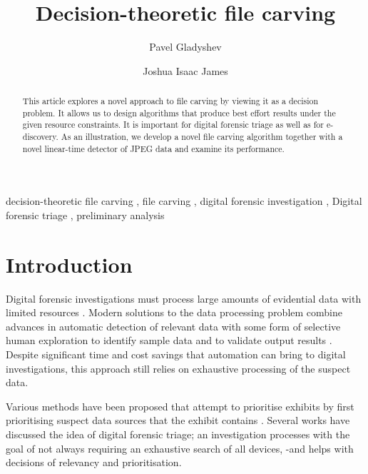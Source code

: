 \documentclass[final,5p,times,twocolumn,authoryear]{elsarticle}
\begin{document}
\begin{frontmatter}

\title{Decision-theoretic file carving}

\author[add1]{Pavel Gladyshev}
\author[add2]{Joshua Isaac James}
\address[add1]{Digital Forensics Investigation Research Laboratory, University College Dublin, Belfield, Dublin 4, Ireland}
\address[add2]{Digital Forensics Investigation Research Laboratory, Hallym University, 1 Hallimdaehak-gil, Chuncheon-si, Gangwon-do, South Korea}
\begin{abstract}
This article explores a novel approach to file carving by viewing it as a decision problem. It allows us to design algorithms that produce best effort results under the given resource constraints. It is important for digital forensic triage as well as for e-discovery. As an illustration, we develop a novel file carving algorithm together with a novel linear-time detector of JPEG data and examine its performance.
\end{abstract}

\begin{keyword}
decision-theoretic file carving \sep 
file carving \sep 
digital forensic investigation \sep 
Digital forensic triage \sep
preliminary analysis
\end{keyword}
\end{frontmatter}

\section{Introduction}

Digital forensic investigations must process large amounts of evidential data with limited resources \citep{Casey2009, pollitt2013triage}. Modern solutions to the data processing problem combine advances in automatic detection of relevant data with some form of selective human exploration to identify sample data and to validate output results \citep{marturana2013machine, schell2007cyber, james2014measuring}. Despite significant time and cost savings that automation can bring to digital investigations, this approach still relies on exhaustive processing of the suspect data.

Various methods have been proposed that attempt to prioritise exhibits by first prioritising suspect data sources that the exhibit contains \citep{shaw2013practical, rogers2003role, overill2013triage}. Several works \citep{Koopmans2013,Casey2009} have discussed the idea of digital forensic triage; an investigation processes with the goal of not always requiring an exhaustive search of all devices, -and helps with decisions of relevancy and prioritisation.
\end{document}
